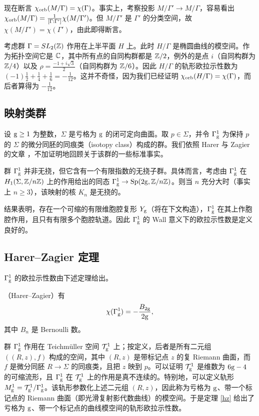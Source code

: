 现在断言 $\chi_{\rm orb}(M/\Gamma)=\chi(\Gamma)$。事实上，考察投影 $M/\Gamma'\to M/\Gamma$，容易看出 $\chi_{\rm  orb}(M/\Gamma)=\frac{1}{[\Gamma:\Gamma']}\chi(M/\Gamma')$。但 $M/\Gamma'$ 是 $\Gamma'$ 的分类空间，故 $\chi(M/\Gamma')=\chi(\Gamma')$，由此即得断言。

\begin{example} 考虑群 $\Gamma=SL_2(\Bbb Z)$ 作用在上半平面 $H$ 上。此时 $H/\Gamma$ 是椭圆曲线的模空间。作为拓扑空间它是 $\Bbb C$，其中所有点的自同构群都是 $\Bbb Z/2$，例外的是点 $i$（自同构群为 $\Bbb Z/4$）以及 $\rho=\frac{-1+i\sqrt{3}}{2}$（自同构群为 $\Bbb Z/6$）。因此 $H/\Gamma$ 的轨形欧拉示性数为 $(-1)\frac{1}{2}+\frac{1}{4}+\frac{1}{6}=-\frac{1}{12}$。这并不奇怪，因为我们已经证明 $\chi_{\rm orb}(H/\Gamma)=\chi(\Gamma)$，而后者算得为 $-\frac{1}{12}$。
\end{example}

\subsection{映射类群}

设 ${\rm g}\ge 1$ 为整数，$\Sigma$ 是亏格为 ${\rm g}$ 的闭可定向曲面。取 $p\in \Sigma$，并令 $\Gamma_{\rm g}^1$ 为保持 $p$ 的 $\Sigma$ 的微分同胚的同痕类（isotopy class）构成的群。我们依照 Harer 与 Zagier 的文章 \cite{HZ}，不加证明地回顾关于该群的一些标准事实。

群 $\Gamma_{\rm g}^1$ 并非无挠，但它含有一个有限指数的无挠子群。具体而言，考虑由 $\Gamma_{\rm g}^1$ 在 $H_1(\Sigma,\Bbb Z/n\Bbb Z)$ 上的作用给出的同态 $\Gamma_{\rm g}^1\to {\rm Sp}(2{\rm g},\Bbb Z/n\Bbb Z)$。则当 $n$ 充分大时（事实上 $n\ge 3$），该映射的核 $K_n$ 是无挠的。

结果表明，存在一个可缩的有限维胞腔复形 $Y_{\rm g}$（将在下文构造），$\Gamma_{\rm g}^1$ 在其上作胞腔作用，且只有有限多个胞腔轨道。因此 $\Gamma_{\rm g}^1$ 的 Wall 意义下的欧拉示性数是定义良好的。

\subsection{Harer–Zagier 定理}

$\Gamma_{\rm g}^1$ 的欧拉示性数由下述定理给出。

\begin{theorem} \label{hz}（Harer–Zagier）有
$$
\chi(\Gamma_{\rm g}^1)=-\frac{B_{2{\rm g}}}{2{\rm g}},
$$
其中 $B_n$ 是 Bernoulli 数。
\end{theorem}

\begin{remark} 群 $\Gamma_{\rm g}^1$ 作用在 Teichmüller 空间 ${\mathcal T}_{\rm g}^1$ 上；按定义，后者是所有二元组 $((R,z),f)$ 构成的空间，其中 $(R,z)$ 是带标记点 $z$ 的复 Riemann 曲面，而 $f$ 是微分同胚 $R\to \Sigma$ 的同痕类，且把 $z$ 映到 $p$。可以证明 ${\mathcal T}_{\rm g}^1$ 是维数为 $6{\rm g}-4$ 的可缩流形，且 $\Gamma_{\rm g}^1$ 在 ${\mathcal T}_{\rm g}^1$ 上的作用是真不连续的。特别地，可以定义轨形 $M_{\rm g}^1={\mathcal T}_{\rm g}^1/\Gamma_{\rm g}^1$。该轨形参数化上述二元组 $(R,z)$，因此称为亏格为 ${\rm g}$、带一个标记点的 Riemann 曲面（即光滑复射影代数曲线）的模空间。于是定理 \ref{hz} 给出了亏格为 ${\rm g}$、带一个标记点的曲线模空间的轨形欧拉示性数。
\end{remark}

